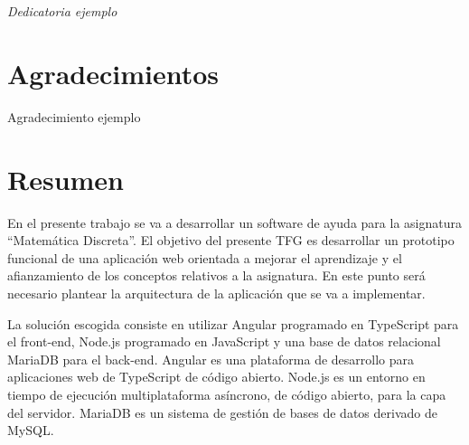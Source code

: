 \documentclass[openright,twoside,10pt]{book}
\begin{document}
    \newpage
    \mbox{}	
    \thispagestyle{empty} %

    \chapter*{}

    \begin{flushright}
        \textit{%
        Dedicatoria ejemplo}
    \end{flushright}

    \chapter*{Agradecimientos} %

    Agradecimiento ejemplo

    \chapter*{Resumen} %

    En el presente trabajo se va a desarrollar un software de ayuda para la
    asignatura ``Matemática Discreta''. El objetivo del presente TFG es
    desarrollar un prototipo funcional de una aplicación web orientada a
    mejorar el aprendizaje y el afianzamiento de los conceptos relativos a
    la asignatura. En este punto será necesario plantear la arquitectura de
    la aplicación que se va a implementar.
    
    La solución escogida consiste en utilizar Angular programado en
    TypeScript para el front-end, Node.js programado en JavaScript y una
    base de datos relacional MariaDB para el back-end. Angular es una
    plataforma de desarrollo para aplicaciones web de TypeScript de código
    abierto. Node.js es un entorno en tiempo de ejecución multiplataforma
    asíncrono, de código abierto, para la capa del servidor. MariaDB es un
    sistema de gestión de bases de datos derivado de MySQL.
    
\end{document}
